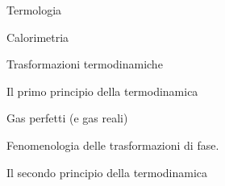 


Termologia




Calorimetria




Trasformazioni termodinamiche


Il primo principio della termodinamica




Gas perfetti (e gas reali)

Fenomenologia delle trasformazioni di fase.



Il secondo principio della termodinamica

